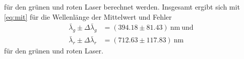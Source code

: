 für den grünen und roten Laser berechnet werden. Insgesamt ergibt sich mit \autoref{eq:mit} für die Wellenlänge der Mittelwert und Fehler 
\begin{align*}
  \bar \lambda_g \pm \Delta \bar \lambda_g&=(394.18 \pm 81.43)\ \textrm{nm}\ \textrm{und}\\
  \bar \lambda_r \pm \Delta \bar \lambda_r&=(712.63 \pm 117.83)\ \textrm{nm}
\end{align*}
für den grünen und roten Laser.
